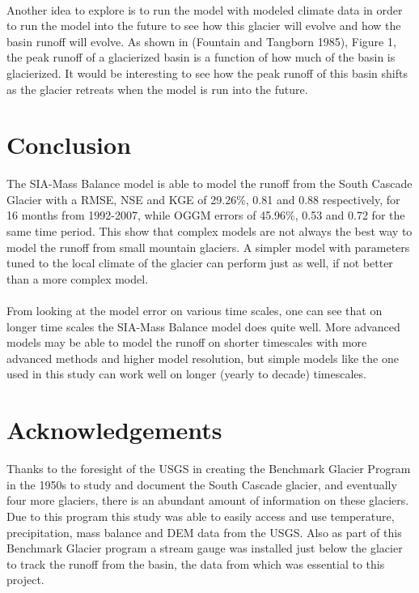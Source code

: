 \documentclass{article}
\begin{document}
\paragraph{}
Another idea to explore is to run the model with modeled climate data in order to run the model into the future to see how this glacier 
will evolve and how the basin runoff will evolve. As shown in (Fountain and Tangborn 1985), Figure 1, the peak runoff of a glacierized basin is a function of 
how much of the basin is glacierized. It would be interesting to see how the peak runoff of this basin shifts as the glacier retreats when the model 
is run into the future.
\section{Conclusion}
The SIA-Mass Balance model is able to model the runoff from the South Cascade Glacier with a RMSE, NSE and KGE of 29.26\%, 0.81 and 0.88 respectively, 
for 16 months from 1992-2007, while OGGM errors of 45.96\%, 0.53 and 0.72 for the same time period. This show that complex models are not always 
the best way to model the runoff from small mountain glaciers. A simpler model with parameters tuned to the local climate of the glacier can 
perform just as well, if not better than a more complex model. 
\paragraph{}
From looking at the model error on various time scales, one can see that on longer time scales the SIA-Mass Balance model does quite well. More 
advanced models may be able to model the runoff on shorter timescales with more advanced methods and higher model resolution, but simple models 
like the one used in this study can work well on longer (yearly to decade) timescales.


\section*{Acknowledgements}
Thanks to the foresight of the USGS in creating the Benchmark Glacier Program in the 1950s to study and document the South Cascade glacier, 
and eventually four more glaciers, there is an abundant amount of information on these glaciers. Due to this program this study was able to 
easily access and use temperature, precipitation, mass balance and DEM data from the USGS. Also as part of this Benchmark Glacier program a 
stream gauge was installed just below the glacier to track the runoff from the basin, the data from which was essential to this project.
\end{document}
